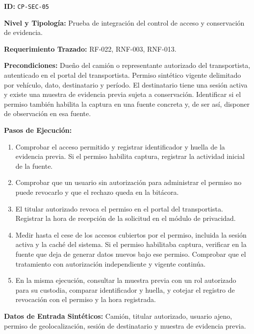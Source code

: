 \par\noindent\textbf{ID:} \texttt{C\allowbreak{}P\allowbreak{}-\allowbreak{}S\allowbreak{}E\allowbreak{}C\allowbreak{}-\allowbreak{}0\allowbreak{}5\allowbreak{}}\par
\par\noindent\textbf{Nivel y Tipología:} Prueba de integración del control de acceso y conservación de evidencia.\par
\par\noindent\textbf{Requerimiento Trazado:} RF-022, RNF-003, RNF-013.\par
\par\noindent\textbf{Precondiciones:} Dueño del camión o representante autorizado del transportista, autenticado en el portal del transportista. Permiso sintético vigente delimitado por vehículo, dato, destinatario y período. El destinatario tiene una sesión activa y existe una muestra de evidencia previa sujeta a conservación. Identificar si el permiso también habilita la captura en una fuente concreta y, de ser así, disponer de observación en esa fuente.\par
\par\noindent\textbf{Pasos de Ejecución:}\par
\begin{enumerate}
\item Comprobar el acceso permitido y registrar identificador y huella de la evidencia previa. Si el permiso habilita captura, registrar la actividad inicial de la fuente.
\item Comprobar que un usuario sin autorización para administrar el permiso no puede revocarlo y que el rechazo queda en la bitácora.
\item El titular autorizado revoca el permiso en el portal del transportista. Registrar la hora de recepción de la solicitud en el módulo de privacidad.
\item Medir hasta el cese de los accesos cubiertos por el permiso, incluida la sesión activa y la caché del sistema. Si el permiso habilitaba captura, verificar en la fuente que deja de generar datos nuevos bajo ese permiso. Comprobar que el tratamiento con autorización independiente y vigente continúa.
\item En la misma ejecución, consultar la muestra previa con un rol autorizado para su custodia, comparar identificador y huella, y cotejar el registro de revocación con el permiso y la hora registrada.
\end{enumerate}
\par\noindent\textbf{Datos de Entrada Sintéticos:} Camión, titular autorizado, usuario ajeno, permiso de geolocalización, sesión de destinatario y muestra de evidencia previa.\par
